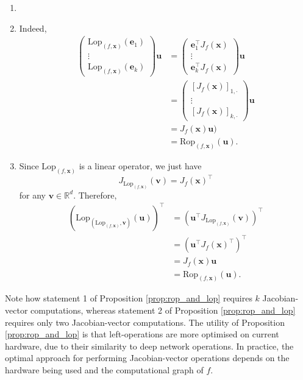\begin{tproof}
    \begin{enumerate}
        \item[]
        \item Indeed, 
        \begin{align*}
            \begin{pmatrix}\mathrm{Lop}_{(f,\mathbf{x})}\left(\mathbf{e}_1\right)\\\vdots\\\mathrm{Lop}_{(f,\mathbf{x})}\left(\mathbf{e}_k\right)\end{pmatrix}\mathbf{u}&=\begin{pmatrix}\mathbf{e}_1^\top J_f(\mathbf{x})\\\vdots\\\mathbf{e}_k^\top J_f(\mathbf{x})\end{pmatrix}\mathbf{u}\\&=\begin{pmatrix}\left[J_f(\mathbf{x})\right]_{1,\cdot}\\\vdots\\\left[J_f(\mathbf{x})\right]_{k,\cdot}\end{pmatrix}\mathbf{u}\\&=J_f(\mathbf{x})\mathbf{u})\\&=\mathrm{Rop}_{(f,\mathbf{x})}(\mathbf{u}).
        \end{align*}
        \item Since $\mathrm{Lop}_{(f,\mathbf{x})}$ is a linear operator, we just have $$J_{\mathrm{Lop}_{(f,\mathbf{x})}}(\mathbf{v})=J_{f}(\mathbf{x})^\top$$for any $\mathbf{v}\in\mathbb{R}^d$. Therefore,
        \begin{align*}
            \left(\mathrm{Lop}_{\left(\mathrm{Lop}_{(f,\mathbf{x})},\mathbf{v}\right)}(\mathbf{u})\right)^\top&=\left(\mathbf{u}^\top J_{\mathrm{Lop}_{(f,\mathbf{x})}}(\mathbf{v})\right)^\top\\&=\left(\mathbf{u}^\top J_f(\mathbf{x})^\top\right)^\top\\&=J_f(\mathbf{x})\mathbf{u}\\&=\mathrm{Rop}_{(f,\mathbf{x})}(\mathbf{u}).
        \end{align*}
    \end{enumerate}
\end{tproof}

\begin{remark}
    Note how statement 1 of Proposition \ref{prop:rop_and_lop} requires $k$ Jacobian-vector computations, whereas statement 2 of Proposition \ref{prop:rop_and_lop} requires only two Jacobian-vector computations. The utility of Proposition \ref{prop:rop_and_lop} is that left-operations are more optimised on current hardware, due to their similarity to deep network operations. In practice, the optimal approach for performing Jacobian-vector operations depends on the hardware being used and the computational graph of $f$.
\end{remark}

